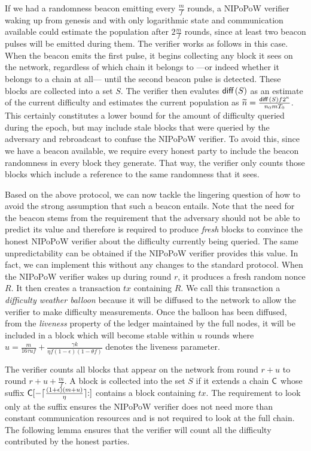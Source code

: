 If we had a randomness beacon emitting every $\frac{m}{f}$ rounds, a NIPoPoW
verifier waking up from genesis and with only logarithmic state and
communication available could estimate the population after $2\frac{m}{f}$
rounds, since at least two beacon pulses will be emitted during them. The
verifier works as follows in this case. When the beacon emits the first pulse,
it begins collecting any block it sees on the network, regardless of which
chain it belongs to ---or indeed whether it belongs to a chain at all--- until
the second beacon pulse is detected. These blocks are collected into a set $S$.
The verifier then evalutes $\operatorname{\textsf{diff}\,}(S)$ as an estimate of the current difficulty
and estimates the current population as
$\widetilde{n} = \frac{\operatorname{\textsf{diff}\,}(S)f 2^\kappa}{n_0 m T_0}$. This certainly constitutes a
lower bound for the amount of difficulty queried during the epoch, but may
include stale blocks that were queried by the adversary and rebroadcast to
confuse the NIPoPoW verifier. To avoid this, since we have a beacon available,
we require every honest party to include the beacon randomness in every block
they generate. That way, the verifier only counts those blocks which include a
reference to the same randomness that it sees.

Based on the above protocol, we can now tackle the lingering question of how to
avoid the strong assumption that such a beacon entails. Note that the need for
the beacon stems from the requirement that the adversary should not be able to
predict its value and therefore is required to produce \emph{fresh} blocks to
convince the honest NIPoPoW verifier about the difficulty currently being
queried. The same unpredictability can be obtained if the NIPoPoW verifier
provides this value. In fact, we can implement this without any changes to the
standard protocol. When the NIPoPoW verifier wakes up during round $r$, it
produces a fresh random nonce $R$. It then creates a transaction $tx$ containing
$R$. We call this transaction a \emph{difficulty weather balloon} because it
will be diffused to the network to allow the verifier to make difficulty
measurements. Once the balloon has been diffused, from the
\emph{liveness} property of the ledger maintained by the full nodes, it will be
included in a block which will become stable within $u$ rounds where $u =
\frac{m}{16\tau uf} + \frac{\gamma k}{\eta f (1 - \epsilon) (1 - \theta f)}$
denotes the liveness parameter.

The verifier counts all blocks that appear on the network from round $r + u$ to
round $r + u + \frac{m}{f}$. A block is collected into the set $S$ if it extends
a chain $\mathsf{C}$ whose suffix
$\mathsf{C}[-\lceil\frac{(1 + \epsilon)(m + u)}{\eta}\rceil{:}]$
contains a block containing $tx$. The requirement to look
only at the suffix ensures the NIPoPoW verifier does not need more than constant
communication resources and is not required to look at the full chain. The
following lemma ensures that the verifier will count all the difficulty
contributed by the honest parties.

